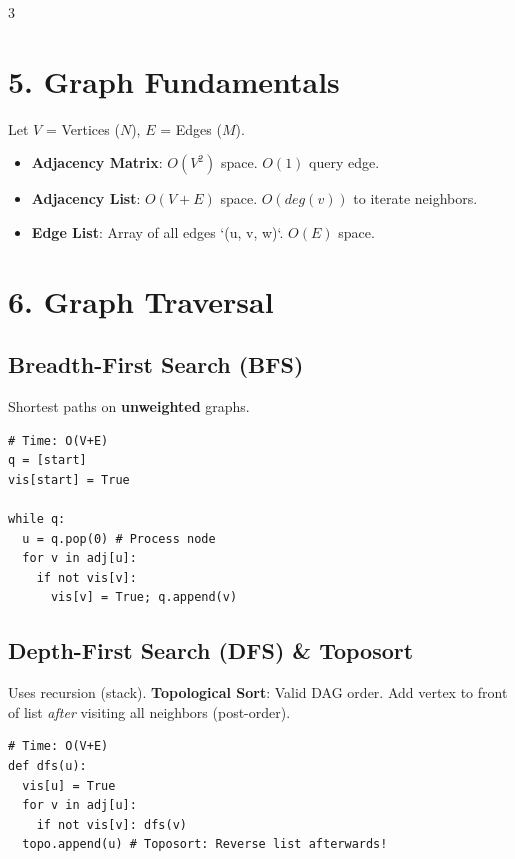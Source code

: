 \documentclass[7pt,landscape]{extarticle}
\begin{document}
\begin{multicols*}{3}
\section*{5. Graph Fundamentals}
Let $V$ = Vertices ($N$), $E$ = Edges ($M$). 
\begin{itemize}
    \item \textbf{Adjacency Matrix}: $O(V^2)$ space. $O(1)$ query edge.
    \item \textbf{Adjacency List}: $O(V+E)$ space. $O(deg(v))$ to iterate neighbors.
    \item \textbf{Edge List}: Array of all edges `(u, v, w)`. $O(E)$ space. 
\end{itemize}


\section*{6. Graph Traversal}
\subsection*{Breadth-First Search (BFS)}
Shortest paths on \textbf{unweighted} graphs.
\begin{lstlisting}
# Time: O(V+E)
q = [start]
vis[start] = True

while q:
  u = q.pop(0) # Process node
  for v in adj[u]:
    if not vis[v]: 
      vis[v] = True; q.append(v)
\end{lstlisting}

\subsection*{Depth-First Search (DFS) \& Toposort}
Uses recursion (stack). \textbf{Topological Sort}: Valid DAG order. Add vertex to front of list \textit{after} visiting all neighbors (post-order).
\begin{lstlisting}
# Time: O(V+E)
def dfs(u):
  vis[u] = True
  for v in adj[u]:
    if not vis[v]: dfs(v)
  topo.append(u) # Toposort: Reverse list afterwards!
\end{lstlisting}


\end{multicols*}
\end{document}
